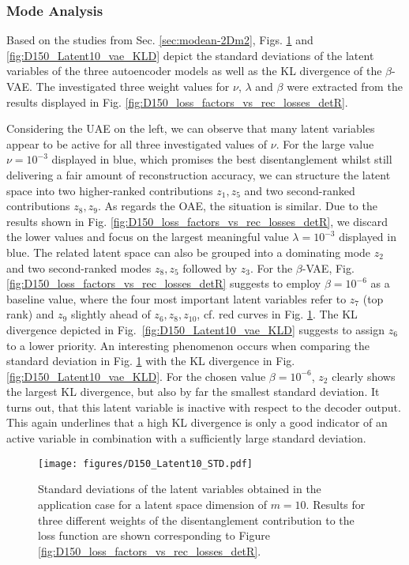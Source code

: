 \subsubsection{Mode Analysis}
\label{sec:modean_D150}
Based on the studies from Sec. \ref{sec:modean-2Dm2}, Figs. \ref{fig:D150_Latent10_std} and \ref{fig:D150_Latent10_vae_KLD} depict the standard deviations of the latent variables of the three autoencoder models as well as the KL divergence of the $\beta$-VAE. The investigated three weight values for  $\nu$, $\lambda$ and $\beta$ were extracted from the results displayed in Fig. \ref{fig:D150_loss_factors_vs_rec_losses_detR}.

\smallskip
Considering the UAE on the left, we can observe that many latent variables appear to be active for all three investigated values of $\nu$.
For the large value $\nu=10^{-3}$ displayed in blue, which promises the best disentanglement whilst still delivering a fair amount of reconstruction accuracy, we can structure the latent space into two higher-ranked contributions $z_1, z_5$ and two second-ranked contributions
$z_8, z_9$.
As regards the OAE, the situation is similar. Due to the results shown in Fig. \ref{fig:D150_loss_factors_vs_rec_losses_detR}, we discard the lower values and focus on the largest meaningful  value $\lambda=10^{-3}$ displayed in blue.
 The related latent space can also be grouped into a dominating mode $z_2$ and two second-ranked modes $z_8, z_5$ followed by $z_3$.
For the $\beta$-VAE, Fig.
\ref{fig:D150_loss_factors_vs_rec_losses_detR} suggests to employ $\beta=10^{-6}$ as a baseline value, where the four most important latent variables refer to $z_7$ (top rank) and  $z_9$ slightly ahead of $z_6, z_8, z_{10}$, cf.  red curves in Fig. \ref{fig:D150_Latent10_std}. The KL divergence depicted in Fig.~\ref{fig:D150_Latent10_vae_KLD} suggests to assign $z_{6}$ to a lower priority. An interesting phenomenon occurs when comparing the standard deviation in Fig. \ref{fig:D150_Latent10_std} with the
KL divergence in Fig. \ref{fig:D150_Latent10_vae_KLD}. For the chosen  value $\beta=10^{-6}$, $z_2$ clearly shows the largest KL divergence, but also by far the smallest standard deviation. It turns out, that this latent variable is inactive with respect to the decoder output. This again underlines that a high KL divergence is only a good indicator of an active variable in combination with a sufficiently large standard deviation. 


\begin{figure}[h!]
    \centering
    \texttt{[image: figures/D150\_Latent10\_STD.pdf]}
    \caption{Standard deviations of the latent variables 
    obtained in the application case for a latent space dimension of $m=10$. Results for three different weights of the disentanglement contribution to the loss function are shown corresponding to Figure \ref{fig:D150_loss_factors_vs_rec_losses_detR}.}
    \label{fig:D150_Latent10_std}
\end{figure}

